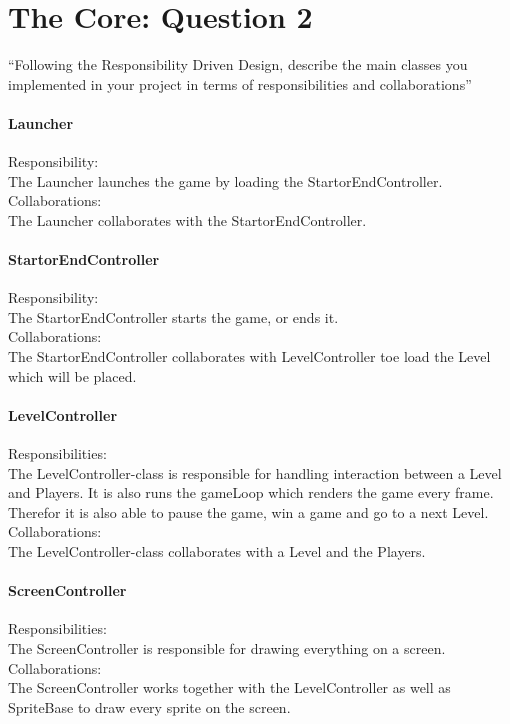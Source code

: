 \chapter{The Core: Question 2}

``Following the Responsibility Driven Design, describe the main classes you implemented in your project in terms of responsibilities and collaborations''

\subsubsection{Launcher}
Responsibility: \\
The Launcher launches the game by loading the StartorEndController. \\
Collaborations: \\
The Launcher collaborates with the StartorEndController. 

\subsubsection{StartorEndController}
Responsibility: \\
The StartorEndController starts the game, or ends it. \\
Collaborations: \\
The StartorEndController collaborates with LevelController toe load the Level which will be placed. 

\subsubsection{LevelController}
Responsibilities: \\
The LevelController-class is responsible for handling interaction between a Level and Players. It is also runs the gameLoop which renders the game every frame. Therefor it is also able to pause the game, win a game and go to a next Level. \\
Collaborations: \\
The LevelController-class collaborates with a Level and the Players.

\subsubsection{ScreenController}
Responsibilities: \\
The ScreenController is responsible for drawing everything on a screen. \\
Collaborations: \\
The ScreenController works together with the LevelController as well as SpriteBase to draw every sprite on the screen. 

